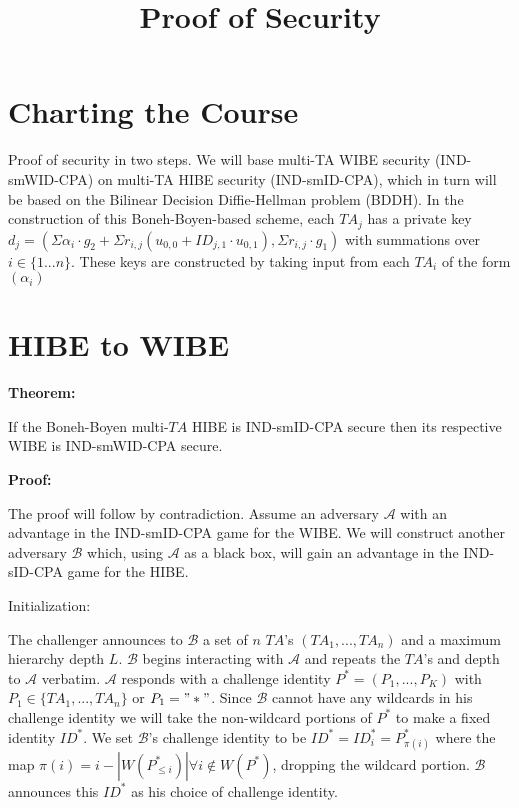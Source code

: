 \documentclass[10pt]{article}
\title{\textbf{Proof of Security}}
\author{  }
\date{ }
\newcommand{\A}{\mathcal{A}}
\newcommand{\B}{\mathcal{B}}
\newcommand{\TA}{\mathit{TA}}
\begin{document}
\ifpdf
{}
\else
{}
\fi

\maketitle

\section*{Charting the Course}

Proof of security in two steps.  We will base multi-TA WIBE security (IND-smWID-CPA) on multi-TA HIBE security (IND-smID-CPA), which in turn will be based on the Bilinear Decision Diffie-Hellman problem (BDDH).  In the construction of this Boneh-Boyen-based scheme, each $\TA_j$ has a private key $d_j = (\Sigma \alpha_i \cdot g_2 + \Sigma r_{i,j}(u_{0,0} + ID_{j,1} \cdot u_{0,1}), \Sigma r_{i,j} \cdot g_1)$ with summations over $i \in \{ 1 ... n\}$.  These keys are constructed by taking input from each $\TA_i$ of the form $(\alpha_i )$

\section*{HIBE to WIBE}
\textbf{Theorem:}

If the Boneh-Boyen multi-$\TA$ HIBE is IND-smID-CPA secure then its respective WIBE is IND-smWID-CPA secure.

\textbf{Proof:}

The proof will follow by contradiction.  Assume an adversary $\A$ with an advantage in the IND-smID-CPA game for the WIBE.  We will construct another adversary $\B$ which, using $\A$ as a black box, will gain an advantage in the IND-sID-CPA game for the HIBE.

Initialization:

The challenger announces to $\B$ a set of $n$ $\TA$'s $(\TA_1, ..., \TA_n)$ and a maximum hierarchy depth $L$. $\B$ begins interacting with $\A$ and repeats the $\TA$'s and depth to $\A$ verbatim.  $\A$ responds with a challenge identity $P^* = (P_1, ..., P_K)$ with $P_1 \in \{\TA_1, ..., \TA_n\}$ or $P_1 = "*"$.  Since $\B$ cannot have any wildcards in his challenge identity we will take the non-wildcard portions of $P^*$ to make a fixed identity $ID^*$.  We set $\B$'s challenge identity to be $ID^* = {ID^*_i} = P^*_{\pi(i)}$ where the map $\pi(i) = i - |W(P^*_{\le i})| \forall i \not\in W(P^*)$, dropping the wildcard portion.  $\B$ announces this $ID^*$ as his choice of challenge identity.
\end{document}
